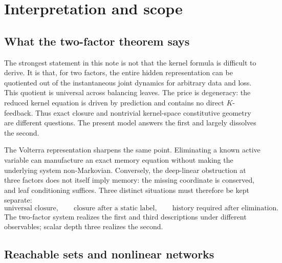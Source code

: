 \section{Interpretation and scope}
\label{sec:interpretation}

\subsection{What the two-factor theorem says}

The strongest statement in this note is not that the kernel formula is difficult to derive.  It is that, for two factors, the entire hidden representation can be quotiented out of the instantaneous joint dynamics for arbitrary data and loss.  This quotient is universal across balancing leaves.  The price is degeneracy: the reduced kernel equation is driven by prediction and contains no direct $K$-feedback.  Thus exact closure and nontrivial kernel-space constitutive geometry are different questions.  The present model answers the first and largely dissolves the second.

The Volterra representation sharpens the same point.  Eliminating a known active variable can manufacture an exact memory equation without making the underlying system non-Markovian.  Conversely, the deep-linear obstruction at three factors does not itself imply memory: the missing coordinate is conserved, and leaf conditioning suffices.  Three distinct situations must therefore be kept separate:
\begin{equation}
  \text{universal closure},
  \qquad
  \text{closure after a static label},
  \qquad
  \text{history required after elimination}.
\end{equation}
The two-factor system realizes the first and third descriptions under different observables; scalar depth three realizes the second.

\subsection{Reachable sets and nonlinear networks}

